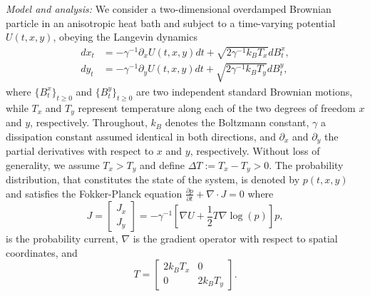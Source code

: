 \documentclass[
 reprint,
superscriptaddress,
 amsmath,amssymb,prl
 aps
]{revtex4-2}
\newcommand{\nablax}{{\partial_x}}
\newcommand{\nablay}{{\partial_y}}
\begin{document}
{\em  Model and analysis:} 
We consider a two-dimensional overdamped Brownian particle in an anisotropic heat bath and subject to a time-varying potential $U(t,x,y)$, obeying the Langevin dynamics
\begin{subequations}	\label{eq:overdamped-Langevin}
\begin{align}
	d x_t &= - \gamma^{-1}\nablax U(t,x,y) d t + \sqrt{{2\gamma^{-1}k_BT_x}} d B^x_t,
\\
		d y_t &= - \gamma^{-1} \nablay U(t,x,y)d t + \sqrt{{2\gamma^{-1}k_BT_y}} d B^y_t,
\end{align}
\end{subequations}
where $\{B^x_t\}_{t\geq 0}$ and $\{B^y_t\}_{t\geq 0}$ are two independent standard Brownian motions, while $T_x$ and $T_y$ represent temperature along each of the two degrees of freedom $x$ and $y$, respectively. Throughout, $k_B$ denotes the Boltzmann constant, $\gamma$ a dissipation constant assumed identical in both directions, and $\nablax$ and $\nablay$ the partial derivatives with respect to $x$ and $y$, respectively. Without loss of generality, we assume $T_x >T_y$ and define $\Delta T :=T_x-T_y>0$. 
The probability distribution, that constitutes the state of the system, is denoted by $p(t,x,y)$ and satisfies the Fokker-Planck equation
    $
    \frac{\partial p}{\partial t}  + \nabla \cdot J = 0
    $
where 
\begin{equation*}\label{eq:flux}
    J =\left[\begin{matrix}J_x\\J_y\end{matrix}\right]= -\gamma^{-1}\left[\nabla U + \frac{1}{2} T \nabla \log(p)\right]p,
\end{equation*}
is the probability current, $\nabla$ is the gradient operator with respect to spatial coordinates, and 
\begin{equation*}
   T= \left[\begin{array}{cc}
         {2k_BT_x}&0  \\
         0& {2k_BT_y}
    \end{array}\right].
\end{equation*}
\end{document}
